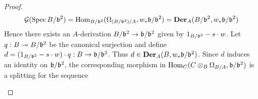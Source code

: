 \begin{proof}
$${\mathcal G}(\mathrm{Spec}\, B/\mathfrak{b}^2)=\mathrm{Hom}_{B/\mathfrak{b}^2}(\Omega_{(B/\mathfrak{b}^2)/A},w_*\mathfrak{b}/\mathfrak{b}^2)=\mathbf{Der}_A(B/\mathfrak{b}^2,w_*\mathfrak{b}/\mathfrak{b}^2)$$
Hence there exists an $A$-derivation $B/\mathfrak{b}^2\rightarrow \mathfrak{b}/\mathfrak{b}^2$ given by $1_{B/\mathfrak{b}^2}-s \cdot w$. Let $q:B\twoheadrightarrow B/\mathfrak{b}^2$ be the canonical surjection and define $d=(1_{B/\mathfrak{b}^2}-s\cdot w)\cdot q:B\rightarrow \mathfrak{b}/\mathfrak{b}^2$. Thus $d\in \mathbf{Der}_A(B,w_*\mathfrak{b}/\mathfrak{b}^2)$. Since $d$ induces an identity on $\mathfrak{b}/\mathfrak{b}^2$, the corresponding morphism in $\mathrm{Hom}_C(C\otimes_B\Omega_{B/A},\mathfrak{b}/\mathfrak{b}^2)$ is a splitting for the sequence
\begin{center}
\end{center}  
\end{proof}

